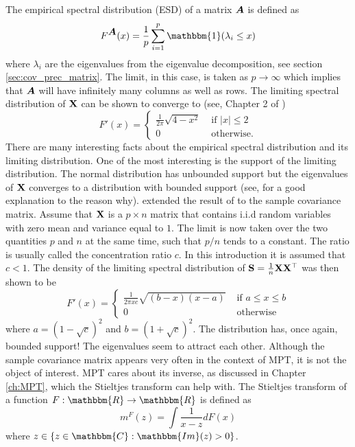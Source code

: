 \documentclass[12pt, oneside]{book}\usepackage{knitr}
\begin{document}
{The empirical spectral distribution (ESD) of a matrix $\mbox{\boldmath$A$}$ is defined as
$$
F^{\bA}(x)= \frac{1}{p} \sum_{i=1}^p \mathbbm{1}(\lambda_i \leq x)
$$ 
where $\lambda_i$ are the eigenvalues from the eigenvalue decomposition, see section \ref{sec:cov_prec_matrix}. 
The limit, in this case, is taken as $p \rightarrow \infty$ which implies that $\mbox{\boldmath$A$}$ will have infinitely many columns as well as rows.
The limiting spectral distribution of $\mathbf{X}$ can be shown to converge to (see, Chapter 2 of \citet{bai2010spectral})
$$
F'(x) = \begin{cases}
\frac{1}{2\pi} \sqrt{4-x^2} & \text{ if } |x|\leq 2 \\
0 & \text{ otherwise.}
\end{cases}
$$
There are many interesting facts about the empirical spectral distribution and its limiting distribution. 
One of the most interesting is the support of the limiting distribution.
The normal distribution has unbounded support but the eigenvalues of $\mathbf{X}$ converges to a distribution with bounded support (see, \citet{livan2018introduction} for a good explanation to the reason why). 
\citet{marchenko1967distribution} extended the result of \citet{wigner1967random} to the sample covariance matrix. 
Assume that $\mathbf{X}$ is a $p \times n$ matrix that contains i.i.d random variables with zero mean and variance equal to $1$.
The limit is now taken over the two quantities $p$ and $n$ at the same time, such that $p/n$ tends to a constant.
The ratio is usually called the concentration ratio $c$.
In this introduction it is assumed that $c<1$. 
The density of the limiting spectral distribution of $\mathbf{S}=\frac{1}{n} \mathbf{X} \mathbf{X}^\top$ was then shown to be
$$
F'(x) = \begin{cases}
\frac{1}{2\pi x c} \sqrt{(b-x)(x-a)} & \text{ if } a \leq x \leq b\\
0 & \text{ otherwise}
\end{cases}
$$
where $a=(1-\sqrt{c})^2$ and $b=(1+\sqrt{c})^2$. 
The distribution has, once again, bounded support! 
The eigenvalues seem to attract each other. 
Although the sample covariance matrix appears very often in the context of MPT, it is not the object of interest. 
MPT cares about its inverse, as discussed in Chapter \ref{ch:MPT}, which the Stieltjes transform can help with. 
The Stieltjes transform of a function $F: \mathbbm{R} \rightarrow \mathbbm{R}$ is defined as 
\begin{equation}\label{eqn:stieltjes}
m^F(z) = \int \frac{1}{x-z}dF(x)
\end{equation}
where $z \in \{z \in \mathbbm{C}: \mathbbm{Im}(z)>0 \}$. 
}
\end{document}

